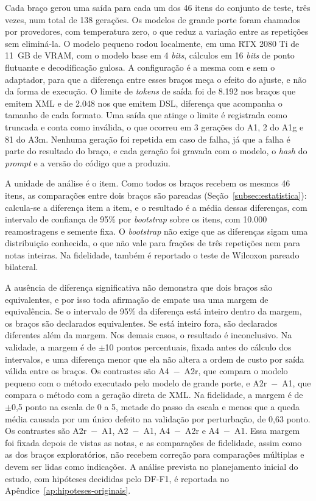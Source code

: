 Cada braço gerou uma saída para cada um dos 46 itens do conjunto de teste, três vezes, num total de 138 gerações. Os modelos de grande porte foram chamados por provedores, com temperatura zero, o que reduz a variação entre as repetições sem eliminá-la. O modelo pequeno rodou localmente, em uma RTX 2080 Ti de 11~GB de VRAM, com o modelo base em 4 \textit{bits}, cálculos em 16 \textit{bits} de ponto flutuante e decodificação gulosa. A configuração é a mesma com e sem o adaptador, para que a diferença entre esses braços meça o efeito do ajuste, e não da forma de execução. O limite de \textit{tokens} de saída foi de 8.192 nos braços que emitem XML e de 2.048 nos que emitem DSL, diferença que acompanha o tamanho de cada formato. Uma saída que atinge o limite é registrada como truncada e conta como inválida, o que ocorreu em 3 gerações do A1, 2 do A1g e 81 do A3m. Nenhuma geração foi repetida em caso de falha, já que a falha é parte do resultado do braço, e cada geração foi gravada com o modelo, o \textit{hash} do \textit{prompt} e a versão do código que a produziu.

A unidade de análise é o item. Como todos os braços recebem os mesmos 46 itens, as comparações entre dois braços são pareadas (Seção~\ref{subsec:estatistica}): calcula-se a diferença item a item, e o resultado é a média dessas diferenças, com intervalo de confiança de 95\% por \textit{bootstrap} sobre os itens, com 10.000 reamostragens e semente fixa. O \textit{bootstrap} não exige que as diferenças sigam uma distribuição conhecida, o que não vale para frações de três repetições nem para notas inteiras. Na fidelidade, também é reportado o teste de Wilcoxon pareado bilateral.

A ausência de diferença significativa não demonstra que dois braços são equivalentes, e por isso toda afirmação de empate usa uma margem de equivalência. Se o intervalo de 95\% da diferença está inteiro dentro da margem, os braços são declarados equivalentes. Se está inteiro fora, são declarados diferentes além da margem. Nos demais casos, o resultado é inconclusivo. Na validade, a margem é de $\pm$10 pontos percentuais, fixada antes do cálculo dos intervalos, e uma diferença menor que ela não altera a ordem de custo por saída válida entre os braços. Os contrastes são A4~$-$~A2r, que compara o modelo pequeno com o método executado pelo modelo de grande porte, e A2r~$-$~A1, que compara o método com a geração direta de XML. Na fidelidade, a margem é de $\pm$0,5 ponto na escala de 0 a 5, metade do passo da escala e menos que a queda média causada por um único defeito na validação por perturbação, de 0,63 ponto. Os contrastes são A2r~$-$~A1, A2~$-$~A1, A4~$-$~A2r e A4~$-$~A1. Essa margem foi fixada depois de vistas as notas, e as comparações de fidelidade, assim como as dos braços exploratórios, não recebem correção para comparações múltiplas e devem ser lidas como indicações. A análise prevista no planejamento inicial do estudo, com hipóteses decididas pelo DF-F1, é reportada no Apêndice~\ref{ap:hipoteses-originais}.
